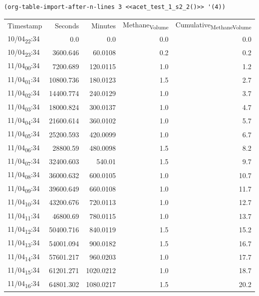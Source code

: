 \documentclass[11pt]{article}
\begin{document}
\begin{verbatim}
(org-table-import-after-n-lines 3 <<acet_test_1_s2_2()>> '(4))
\end{verbatim}

\begin{center}
\begin{tabular}{lrrrr}
Timestamp & Seconds & Minutes & Methane\textsubscript{Volume} & Cumulative\textsubscript{Methane}\textsubscript{Volume}\\[0pt]
10/04\textsubscript{22}:34 & 0.0 & 0.0 & 0.0 & 0.0\\[0pt]
10/04\textsubscript{23}:34 & 3600.646 & 60.0108 & 0.2 & 0.2\\[0pt]
11/04\textsubscript{00}:34 & 7200.689 & 120.0115 & 1.0 & 1.2\\[0pt]
11/04\textsubscript{01}:34 & 10800.736 & 180.0123 & 1.5 & 2.7\\[0pt]
11/04\textsubscript{02}:34 & 14400.774 & 240.0129 & 1.0 & 3.7\\[0pt]
11/04\textsubscript{03}:34 & 18000.824 & 300.0137 & 1.0 & 4.7\\[0pt]
11/04\textsubscript{04}:34 & 21600.614 & 360.0102 & 1.0 & 5.7\\[0pt]
11/04\textsubscript{05}:34 & 25200.593 & 420.0099 & 1.0 & 6.7\\[0pt]
11/04\textsubscript{06}:34 & 28800.59 & 480.0098 & 1.5 & 8.2\\[0pt]
11/04\textsubscript{07}:34 & 32400.603 & 540.01 & 1.5 & 9.7\\[0pt]
11/04\textsubscript{08}:34 & 36000.632 & 600.0105 & 1.0 & 10.7\\[0pt]
11/04\textsubscript{09}:34 & 39600.649 & 660.0108 & 1.0 & 11.7\\[0pt]
11/04\textsubscript{10}:34 & 43200.676 & 720.0113 & 1.0 & 12.7\\[0pt]
11/04\textsubscript{11}:34 & 46800.69 & 780.0115 & 1.0 & 13.7\\[0pt]
11/04\textsubscript{12}:34 & 50400.716 & 840.0119 & 1.5 & 15.2\\[0pt]
11/04\textsubscript{13}:34 & 54001.094 & 900.0182 & 1.5 & 16.7\\[0pt]
11/04\textsubscript{14}:34 & 57601.217 & 960.0203 & 1.0 & 17.7\\[0pt]
11/04\textsubscript{15}:34 & 61201.271 & 1020.0212 & 1.0 & 18.7\\[0pt]
11/04\textsubscript{16}:34 & 64801.302 & 1080.0217 & 1.5 & 20.2\\[0pt]

\end{tabular}
\end{center}
\end{document}
